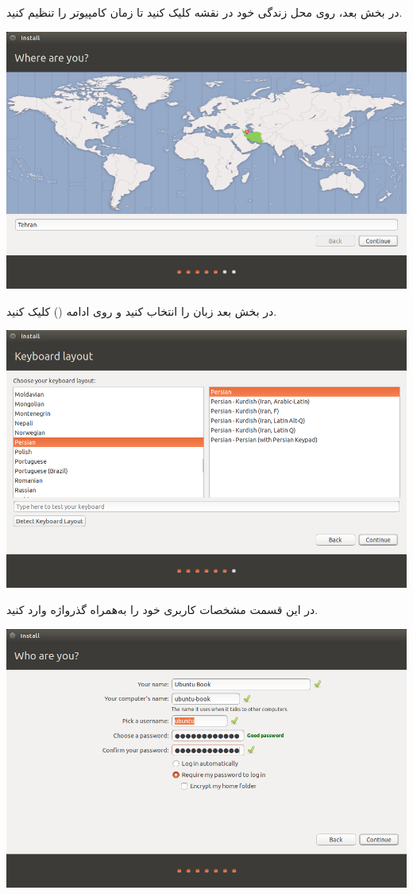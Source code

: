در بخش بعد، روی محل زندگی خود در نقشه کلیک کنید تا زمان کامپیوتر را تنظیم 
کنید.\\
\begin{center}
\includegraphics[scale=0.47]{pics/9.png}\\
\end{center}
در بخش بعد زبان  را انتخاب کنید و روی ادامه () کلیک 
کنید.

\begin{center}
\includegraphics[scale=0.47]{pics/10.png}\\
\end{center}

در این قسمت مشخصات کاربری خود را به‌همراه گذرواژه وارد کنید.
\begin{center}
\includegraphics[scale=0.47]{pics/11.png}
\end{center}

